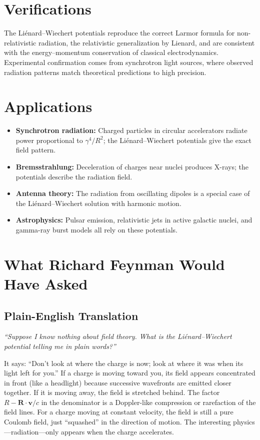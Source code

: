 \documentclass[11pt,openright]{book}
\begin{document}
\section*{Verifications}

The Liénard--Wiechert potentials reproduce the correct Larmor formula for non-relativistic radiation, the relativistic generalization by Lienard, and are consistent with the energy--momentum conservation of classical electrodynamics. Experimental confirmation comes from synchrotron light sources, where observed radiation patterns match theoretical predictions to high precision.
\section*{Applications}

\begin{itemize}
  \item \textbf{Synchrotron radiation:} Charged particles in circular accelerators radiate power proportional to $\gamma^{4}/R^{2}$; the Liénard--Wiechert potentials give the exact field pattern.
  \item \textbf{Bremsstrahlung:} Deceleration of charges near nuclei produces X-rays; the potentials describe the radiation field.
  \item \textbf{Antenna theory:} The radiation from oscillating dipoles is a special case of the Liénard--Wiechert solution with harmonic motion.
  \item \textbf{Astrophysics:} Pulsar emission, relativistic jets in active galactic nuclei, and gamma-ray burst models all rely on these potentials.
\end{itemize}
\section*{What Richard Feynman Would Have Asked}

\subsection*{Plain-English Translation}
\textit{``Suppose I know nothing about field theory. What is the Liénard--Wiechert potential telling me in plain words?''}

It says: ``Don't look at where the charge is now; look at where it was when its light left for you.'' If a charge is moving toward you, its field appears concentrated in front (like a headlight) because successive wavefronts are emitted closer together. If it is moving away, the field is stretched behind. The factor $R - \mathbf{R}\cdot\mathbf{v}/c$ in the denominator is a Doppler-like compression or rarefaction of the field lines. For a charge moving at constant velocity, the field is still a pure Coulomb field, just ``squashed'' in the direction of motion. The interesting physics---radiation---only appears when the charge accelerates.
\end{document}
